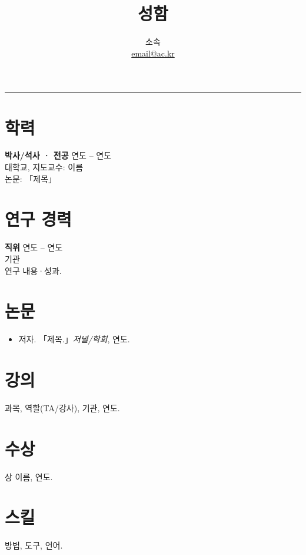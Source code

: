 \documentclass[11pt,a4paper]{article}
\title{\vspace{-1cm}\textbf{성함}}
\author{소속 \\ \href{mailto:email@ac.kr}{email@ac.kr}}
\date{}
\begin{document}
\maketitle
\vspace{-0.6cm}
\begin{flushright}\rule{2cm}{2.5cm}\end{flushright}
\section*{학력}
\textbf{박사/석사 · 전공} \hfill 연도 -- 연도 \\
대학교, 지도교수: 이름 \\
논문: 「제목」

\section*{연구 경력}
\textbf{직위} \hfill 연도 -- 연도 \\
기관 \\
연구 내용·성과.

\section*{논문}
\begin{itemize}
  \item 저자. 「제목.」\textit{저널/학회}, 연도.
\end{itemize}

\section*{강의}
과목, 역할(TA/강사), 기관, 연도.

\section*{수상}
상 이름, 연도.

\section*{스킬}
방법, 도구, 언어.
\end{document}

